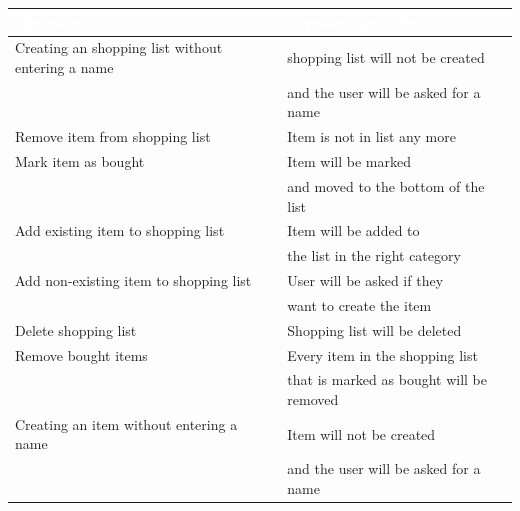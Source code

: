 \documentclass[12pt]{article}
\theoremstyle{definition}
\begin{document}
\begin{tabular}{|l|l|}
\hline
\cellcolor[gray]{0.5}\textcolor{white}{Test step} & \cellcolor[gray]{0.5}\textcolor{white}{Expected behaviour} \\ \hline
Creating an shopping list without entering a name & shopping list will not be created \\ 
 & and the user will be asked for a name \\ \hline
Remove item from shopping list & Item is not in list any more \\ \hline
Mark item as bought & Item will be marked \\
& and moved to the bottom of the list \\ \hline
Add existing item to shopping list & Item will be added to \\
& the list in the right category \\ \hline
Add non-existing item to shopping list & User will be asked if they \\
& want to create the item \\ \hline
Delete shopping list & Shopping list will be deleted \\ \hline
Remove bought items & Every item in the shopping list \\
& that is marked as bought will be removed \\ \hline
Creating an item without entering a name & Item will not be created \\ 
 & and the user will be asked for a name \\ \hline

\end{tabular}

\pagebreak
\end{document}
